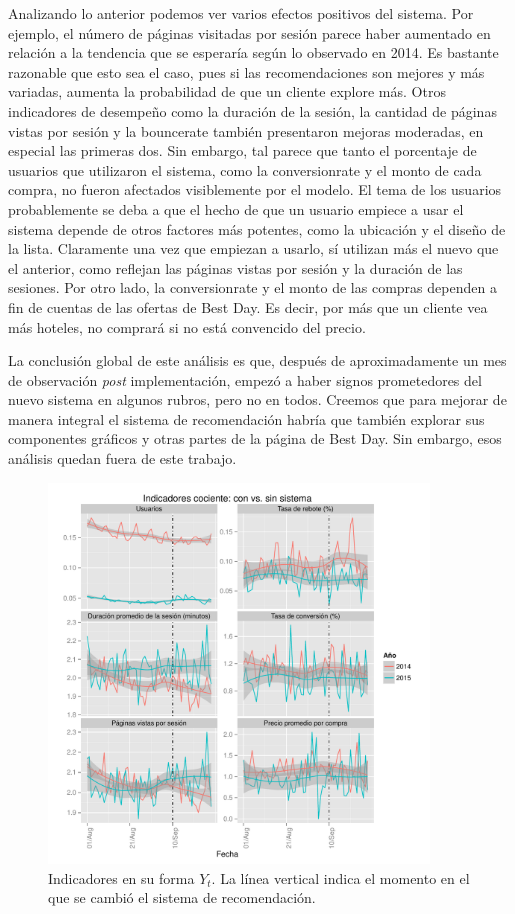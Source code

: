 \documentclass[12pt]{report}
\begin{document}
Analizando lo anterior podemos ver varios efectos positivos del sistema. Por ejemplo, el número de páginas visitadas por sesión parece haber aumentado en relación a la tendencia que se esperaría según lo observado en 2014. Es bastante razonable que esto sea el caso, pues si las recomendaciones son mejores y más variadas, aumenta la probabilidad de que un cliente explore más. Otros indicadores de desempeño como la duración de la sesión, la cantidad de páginas vistas por sesión y la \gls{bouncerate} también presentaron mejoras moderadas, en especial las primeras dos. Sin embargo, tal parece que tanto el porcentaje de usuarios que utilizaron el sistema, como la \gls{conversionrate} y el monto de cada compra, no fueron afectados visiblemente por el modelo. El tema de los usuarios probablemente se deba a que el hecho de que un usuario empiece a usar el sistema depende de otros factores más potentes, como la ubicación y el diseño de la lista. Claramente una vez que empiezan a usarlo, sí utilizan más el nuevo que el anterior, como reflejan las páginas vistas por sesión y la duración de las sesiones. Por otro lado, la \gls{conversionrate} y el monto de las compras dependen a fin de cuentas de las ofertas de Best Day. Es decir, por más que un cliente vea más hoteles, no comprará si no está convencido del precio.

La conclusión global de este análisis es que, después de aproximadamente un mes de observación \emph{post} implementación, empezó a haber signos prometedores del nuevo sistema en algunos rubros, pero no en todos. Creemos que para mejorar de manera integral el sistema de recomendación habría que también explorar sus componentes gráficos y otras partes de la página de Best Day. Sin embargo, esos análisis quedan fuera de este trabajo.

\begin{figure}[h!t]
	\centering
	\includegraphics[width=0.9\textwidth]{imagenes/analytics_anios_y.pdf}
	\caption{\label{fig:analytics_y} Indicadores en su forma $Y_t$. La línea vertical indica el momento en el que se cambió el sistema de recomendación.}
\end{figure}
\end{document}
